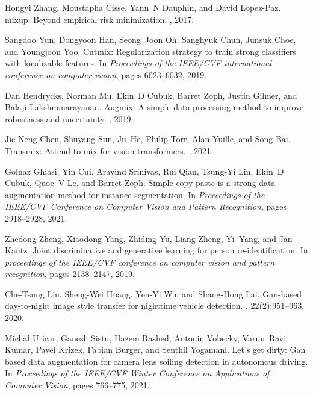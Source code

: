 \documentclass[sn-mathphys]{sn-jnl}%
\theoremstyle{thmstyleone}%
\theoremstyle{thmstyletwo}%
\theoremstyle{thmstylethree}%
\begin{document}
\begin{thebibliography}{10}
Hongyi Zhang, Moustapha Cisse, Yann~N Dauphin, and David Lopez-Paz.
\newblock mixup: Beyond empirical risk minimization.
, 2017.

Sangdoo Yun, Dongyoon Han, Seong~Joon Oh, Sanghyuk Chun, Junsuk Choe, and
  Youngjoon Yoo.
\newblock Cutmix: Regularization strategy to train strong classifiers with
  localizable features.
\newblock In {\em Proceedings of the IEEE/CVF international conference on
  computer vision}, pages 6023--6032, 2019.

Dan Hendrycks, Norman Mu, Ekin~D Cubuk, Barret Zoph, Justin Gilmer, and Balaji
  Lakshminarayanan.
\newblock Augmix: A simple data processing method to improve robustness and
  uncertainty.
, 2019.

Jie-Neng Chen, Shuyang Sun, Ju~He, Philip Torr, Alan Yuille, and Song Bai.
\newblock Transmix: Attend to mix for vision transformers.
, 2021.

Golnaz Ghiasi, Yin Cui, Aravind Srinivas, Rui Qian, Tsung-Yi Lin, Ekin~D Cubuk,
  Quoc~V Le, and Barret Zoph.
\newblock Simple copy-paste is a strong data augmentation method for instance
  segmentation.
\newblock In {\em Proceedings of the IEEE/CVF Conference on Computer Vision and
  Pattern Recognition}, pages 2918--2928, 2021.


Zhedong Zheng, Xiaodong Yang, Zhiding Yu, Liang Zheng, Yi~Yang, and Jan Kautz.
\newblock Joint discriminative and generative learning for person
  re-identification.
\newblock In {\em proceedings of the IEEE/CVF conference on computer vision and
  pattern recognition}, pages 2138--2147, 2019.

Che-Tsung Lin, Sheng-Wei Huang, Yen-Yi Wu, and Shang-Hong Lai.
\newblock Gan-based day-to-night image style transfer for nighttime vehicle
  detection.
,
  22(2):951--963, 2020.

Michal Uricar, Ganesh Sistu, Hazem Rashed, Antonin Vobecky, Varun~Ravi Kumar,
  Pavel Krizek, Fabian Burger, and Senthil Yogamani.
\newblock Let's get dirty: Gan based data augmentation for camera lens soiling
  detection in autonomous driving.
\newblock In {\em Proceedings of the IEEE/CVF Winter Conference on Applications
  of Computer Vision}, pages 766--775, 2021.


\end{thebibliography}
\end{document}
